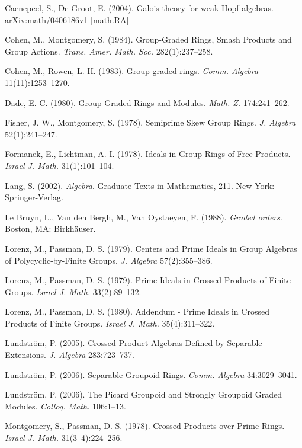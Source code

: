 \documentclass[11pt,leqno]{amsart}
\theoremstyle{plain}
\theoremstyle{definition}
\begin{document}
\begin{thebibliography}{99}

Caenepeel, S.,
De Groot, E. (2004).
Galois theory for weak Hopf algebras.
arXiv:math/0406186v1 [math.RA]

Cohen, M.,
Montgomery, S. (1984).
Group-Graded Rings, Smash Products and Group Actions.
{\it Trans. Amer. Math. Soc.} 282(1):237--258.

Cohen, M.,
Rowen, L. H. (1983).
Group graded rings.
{\it Comm. Algebra} 11(11):1253--1270.

Dade, E. C. (1980).
Group Graded Rings and Modules.
{\it Math. Z.} 174:241--262.

Fisher, J. W.,
Montgomery, S. (1978).
Semiprime Skew Group Rings.
{\it J. Algebra} 52(1):241--247.

Formanek, E.,
Lichtman, A. I. (1978).
Ideals in Group Rings of Free Products.
{\it Israel J. Math.} 31(1):101--104.

Lang, S. (2002).
{\it Algebra}. Graduate Texts in Mathematics, 211.
New York: Springer-Verlag.

Le Bruyn, L., Van den Bergh, M., Van Oystaeyen, F. (1988).
{\it Graded orders}.
Boston, MA: Birkh\"{a}user.

Lorenz, M.,
Passman, D. S. (1979).
Centers and Prime Ideals in Group Algebras of Polycyclic-by-Finite Groups.
{\it J. Algebra} 57(2):355--386.

Lorenz, M., Passman, D. S. (1979).
Prime Ideals in Crossed Products of Finite Groups.
{\it Israel J. Math.} 33(2):89--132.

Lorenz, M., Passman, D. S. (1980).
Addendum - Prime Ideals in Crossed Products of Finite Groups.
{\it Israel J. Math.} 35(4):311--322.

Lundstr\"{o}m, P. (2005).
Crossed Product Algebras Defined by Separable Extensions.
{\it J. Algebra} 283:723--737.

Lundstr\"{o}m, P. (2006).
Separable Groupoid Rings.
{\it Comm. Algebra} 34:3029--3041.

Lundstr\"{o}m, P. (2006).
The Picard Groupoid and Strongly Groupoid Graded Modules.
{\it Colloq. Math.} 106:1--13.

Montgomery, S.,
Passman, D. S. (1978).
Crossed Products over Prime Rings.
{\it Israel J. Math.} 31(3--4):224--256.


\end{thebibliography}
\end{document}
